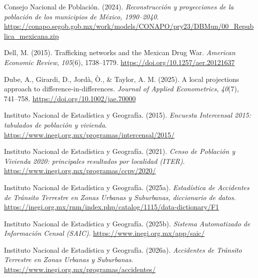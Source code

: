 \documentclass[11pt,letterpaper]{article}
\begin{document}
\par\hangindent=0.5in\noindent Consejo Nacional de Población. (2024). \emph{Reconstrucción y proyecciones de la población de los municipios de México, 1990--2040}. \url{https://conapo.segob.gob.mx/work/models/CONAPO/pry23/DBMun/00_Republica_mexicana.zip}\par

\par\hangindent=0.5in\noindent Dell, M. (2015). Trafficking networks and the Mexican Drug War. \emph{American Economic Review}, \emph{105}(6), 1738--1779. \url{https://doi.org/10.1257/aer.20121637}\par

\par\hangindent=0.5in\noindent Dube, A., Girardi, D., Jordà, Ò., \& Taylor, A. M. (2025). A local projections approach to difference-in-differences. \emph{Journal of Applied Econometrics}, \emph{40}(7), 741--758. \url{https://doi.org/10.1002/jae.70000}\par

\par\hangindent=0.5in\noindent Instituto Nacional de Estadística y Geografía. (2015). \emph{Encuesta Intercensal 2015: tabulados de población y vivienda}. \url{https://www.inegi.org.mx/programas/intercensal/2015/}\par

\par\hangindent=0.5in\noindent Instituto Nacional de Estadística y Geografía. (2021). \emph{Censo de Población y Vivienda 2020: principales resultados por localidad (ITER)}. \url{https://www.inegi.org.mx/programas/ccpv/2020/}\par

\par\hangindent=0.5in\noindent Instituto Nacional de Estadística y Geografía. (2025a). \emph{Estadística de Accidentes de Tránsito Terrestre en Zonas Urbanas y Suburbanas, diccionario de datos}. \url{https://inegi.org.mx/rnm/index.php/catalog/1115/data-dictionary/F1}\par

\par\hangindent=0.5in\noindent Instituto Nacional de Estadística y Geografía. (2025b). \emph{Sistema Automatizado de Información Censal (SAIC)}. \url{https://www.inegi.org.mx/app/saic/}\par

\par\hangindent=0.5in\noindent Instituto Nacional de Estadística y Geografía. (2026a). \emph{Accidentes de Tránsito Terrestre en Zonas Urbanas y Suburbanas}. \url{https://www.inegi.org.mx/programas/accidentes/}\par
\end{document}
